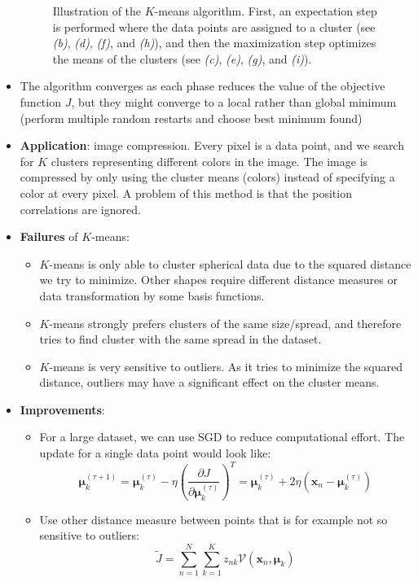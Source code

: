 \begin{itemize}
\begin{figure}[ht]
		\caption{Illustration of the $K$-means algorithm. First, an expectation step is performed where the data points are assigned to a cluster (see \textit{(b)}, \textit{(d)}, \textit{(f)}, and \textit{(h)}), and then the maximization step optimizes the means of the clusters (see \textit{(c)}, \textit{(e)}, \textit{(g)}, and \textit{(i)}).}
		\label{img:k_means_example}
	\end{figure}
	\item The algorithm converges as each phase reduces the value of the objective function $J$, but they might converge to a local rather than global minimum (perform multiple random restarts and choose best minimum found)
	\item \textbf{Application}: image compression. Every pixel is a data point, and we search for $K$ clusters representing different colors in the image. The image is compressed by only using the cluster means (colors) instead of specifying a color at every pixel. A problem of this method is that the position correlations are ignored.
	\item \textbf{Failures} of $K$-means:
	\begin{itemize}
		\item $K$-means is only able to cluster spherical data due to the squared distance we try to minimize. Other shapes require different distance measures or data transformation by some basis functions.
		\item $K$-means strongly prefers clusters of the same size/spread, and therefore tries to find cluster with the same spread in the dataset.
		\item $K$-means is very sensitive to outliers. As it tries to minimize the squared distance, outliers may have a significant effect on the cluster means.
	\end{itemize}
	\item \textbf{Improvements}:
	\begin{itemize}
		\item For a large dataset, we can use SGD to reduce computational effort. The update for a single data point would look like:
		$$\bm{\mu}_k^{(\tau+1)} = \bm{\mu}_k^{(\tau)} - \eta \left(\frac{\partial J}{\partial \bm{\mu}_k^{(\tau)}}\right)^T = \bm{\mu}_k^{(\tau)} + 2 \eta \left(\bm{x}_n - \bm{\mu}_k^{(\tau)}\right)$$
		\item Use other distance measure between points that is for example not so sensitive to outliers:
		$$\tilde{J} = \sum\limits_{n=1}^{N}\sum\limits_{k=1}^{K} z_{nk} \mathcal{V}\left(\bm{x}_n, \bm{\mu}_k\right)$$

\end{itemize}
\end{itemize}
